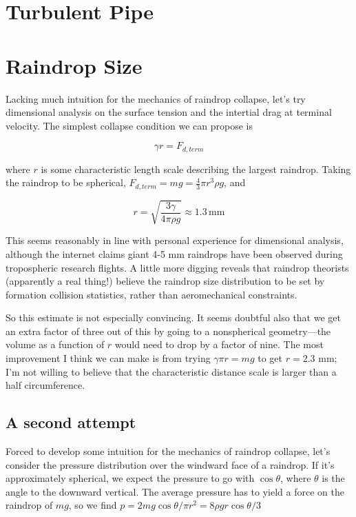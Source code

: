 \documentclass[12pt]{article}
\begin{document}
\section{Turbulent Pipe}




\section{Raindrop Size}

Lacking much intuition for the mechanics of raindrop collapse, let's try dimensional analysis on the surface tension and the intertial drag at terminal velocity. The simplest collapse condition we can propose is 

\[ \gamma r = F_{d,term}
\]

where \(r\) is some characteristic length scale describing the largest raindrop. Taking the raindrop to be spherical, \(F_{d,term} = mg = \frac{4}{3}\pi r^3 \rho g\), and

\[ r = \sqrt{\frac{3\gamma}{4\pi\rho g}} \approx 1.3 \, \mathrm{mm}
\]

This seems reasonably in line with personal experience for dimensional analysis, although the internet claims giant 4-5 mm raindrops have been observed during tropospheric research flights. A little more digging reveals that raindrop theorists (apparently a real thing!) believe the raindrop size distribution to be set by formation collision statistics, rather than aeromechanical constraints.

So this estimate is not especially convincing. It seems doubtful also that we get an extra factor of three out of this by going to a nonspherical geometry---the volume as a function of \(r\) would need to drop by a factor of nine. The most improvement I think we can make is from trying \(\gamma \pi r = mg\) to get \(r=2.3\) mm; I'm not willing to believe that the characteristic distance scale is larger than a half circumference. 

\subsection{A second attempt}

Forced to develop some intuition for the mechanics of raindrop collapse, let's consider the pressure distribution over the windward face of a raindrop. If it's approximately spherical, we expect the pressure to go with \(\cos\theta\), where \(\theta\) is the angle to the downward vertical. The average pressure has to yield a force on the raindrop of \(mg\), so we find \(p = 2mg\cos\theta/\pi r^2 = 8\rho g r \cos\theta/3\)
\end{document}
